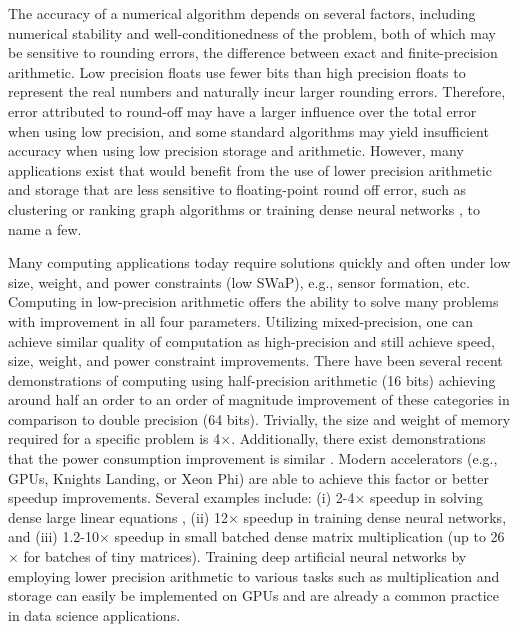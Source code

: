 The accuracy of a numerical algorithm depends on several factors, including numerical stability and well-conditionedness of the problem, both of which may be sensitive to rounding errors, the difference between exact and finite-precision arithmetic. 
Low precision floats use fewer bits than high precision floats to represent the real numbers and naturally incur larger rounding errors. 
Therefore, error attributed to round-off may have a larger influence over the total error when using low precision, and some standard algorithms may yield insufficient accuracy when using low precision storage and arithmetic.
However, many applications exist that would benefit from the use of lower precision arithmetic and storage that are less sensitive to floating-point round off error, such as clustering or ranking graph algorithms \cite{vonLuxburg2007} or training dense neural networks \cite{micikevicius2018mixed}, to name a few.\par

Many computing applications today require solutions quickly and often under low size, weight, and power constraints (low SWaP), e.g., sensor formation, etc. 
Computing in low-precision arithmetic offers the ability to solve many problems with improvement in all four parameters.
Utilizing mixed-precision, one can achieve similar quality of computation as high-precision and still achieve 
speed, size, weight, and power constraint improvements. 
There have been several recent demonstrations of computing using half-precision arithmetic (16 bits) achieving around half an order to an 
order of magnitude improvement of these categories in comparison to double precision (64 bits).
Trivially, the size and weight of memory required for a specific problem is 4$\times$.
Additionally, there exist demonstrations that the power consumption improvement is similar
\cite{fagan2016powerwall}.
Modern accelerators (e.g., GPUs, Knights Landing, or Xeon Phi) are able to achieve this factor or better speedup improvements.
Several examples include:
(i)   2-4$\times$ speedup in solving dense large linear equations \cite{haidar2018iterative,haidar2019tensorcore},
(ii)  12$\times$ speedup in training dense neural networks,
and
(iii) 1.2-10$\times$ speedup in small batched dense matrix multiplication \cite{abdelfattah2019batched} (up to 26$\times$ for batches of tiny matrices).
Training deep artificial neural networks by employing lower precision arithmetic to various tasks such as multiplication \cite{Courbariaux2014Mult} and storage \cite{Courbariaux2014Storage} can easily be implemented on GPUs and are already a common practice in data science applications.\par

